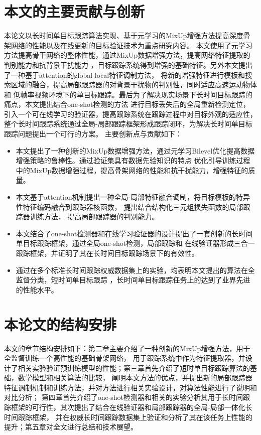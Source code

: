 \documentclass[promaster]{thesis-uestc}
\begin{document}
\section{本文的主要贡献与创新}
本论文以长时间单目标跟踪算法实现、基于元学习的MixUp增强方法提高深度骨架网络的性能以及在线更新的目标验证技术为重点研究内容。
本文使用了元学习方法提高骨干网络的整体性能，通过MixUp数据增强方法，提高网络特征提取的判别能力和抗背景干扰能力
，目标跟踪系统得到增强的基础特征。另外本文提出了一种基于attention的global-local特征调制方法，
将新的增强特征进行模板和搜索区域的融合，提高局部跟踪器的对背景干扰物的判别性，同时适应高速运动物体和
低帧率视频环境下的单目标跟踪。最后为了解决现实场景下长时间目标跟踪的痛点，本文提出结合one-shot检测的方法
进行目标丢失后的全局重新检测定位，引入一个可在线学习的验证器，提高跟踪系统在跟踪过程中对目标外观的适应性，
整个长时间跟踪系统通过全局-局部跟踪框架形成跟踪闭环，为解决长时间单目标跟踪问题提出一个可行的方案。
主要创新点与贡献如下：
\begin{itemize}
    \item 本文提出了一种创新的MixUp数据增强方法，通过元学习Bilevel优化提高数据增强策略的鲁棒性。通过验证集具有数据先验知识的特点
    优化引导训练过程中的MixUp数据增强过程，提高骨架网络的性能和抗干扰能力，增强特征的质量。
    \item 本文基于attention机制提出一种全局-局部特征融合调制，将目标模板的特异性特征编码融合到跟踪器核函数，
    提出结合结构化三元组损失函数的局部跟踪器训练方法，
    提高局部跟踪器的判别能力。
    \item 本文结合了one-shot检测器和在线学习验证器的设计提出了一套创新的长时间单目标跟踪框架，通过全局one-shot检测，局部跟踪和
    在线验证器形成三合一跟踪框架，并证明了其在长时间目标跟踪场景下的有效性。
    \item 通过在多个标准长时间跟踪权威数据集上的实验，均表明本文提出的算法在全监督分类，短时间单目标跟踪
    ，长时间单目标跟踪任务上的达到了业界先进的性能水平。
\end{itemize}

\section{本论文的结构安排}
本文的章节结构安排如下：第二章主要介绍了一种创新的MixUp增强方法，用于全监督训练一个高性能的基础骨架网络，
用于跟踪系统中作为特征提取器，并设计了相关实验验证预训练模型的性能；第三章首先介绍了短时单目标跟踪算法的基础，数学模型和相关算法的比较，
阐明本文方法的优点，并提出新的局部跟踪器特征调制机制和训练方法，并对方法进行相关实验设计，对算法性能进行了说明和对比分析；
第四章首先介绍了one-shot检测器和相关的实验分析其用于长时间跟踪框架的可行性，其次提出了结合在线验证器和局部跟踪器的全局-局部一体化长时间跟踪框架，
并在权威长时间跟踪数据集上验证和分析了其在该任务上性能的提升；第五章对全文进行总结和技术展望。
\end{document}
